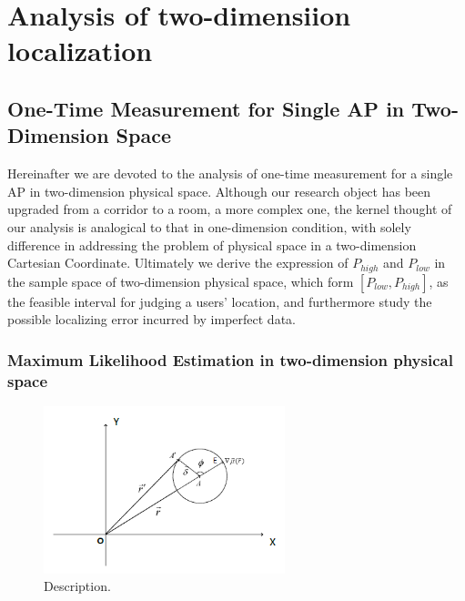 \documentclass[10pt,conference,compsocconf,letterpaper]{IEEEtran}
\begin{document}
\section{Analysis of two-dimensiion localization}\label{loss}
\subsection{One-Time Measurement for Single AP in Two-Dimension Space}
Hereinafter we are devoted to the analysis of one-time measurement for a single AP in two-dimension physical space. Although our research object has been upgraded from a corridor to a room, a more complex one, the kernel thought of our analysis is analogical to that in one-dimension condition, with solely difference in addressing the problem of physical space in a two-dimension Cartesian Coordinate. Ultimately we derive the expression of $P_{high}$ and $P_{low}$ in the sample space of two-dimension physical space, which form $[{P_{low}},{P_{high}}]$, as the feasible interval for judging a users' location, and furthermore study the possible localizing error incurred by imperfect data.

\subsubsection{Maximum Likelihood Estimation in two-dimension physical space}
\begin{figure}[!htbp]
\centering
\includegraphics [width = 7cm]{Figure1.png}
\caption{Description.}
\label{fig:1}
\end{figure}
\end{document}
